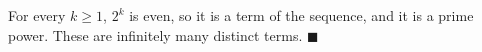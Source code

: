 For every $k\ge1$, $2^k$ is even, so it is a term of the sequence, and it is a prime power. These are infinitely many distinct terms. $\blacksquare$
